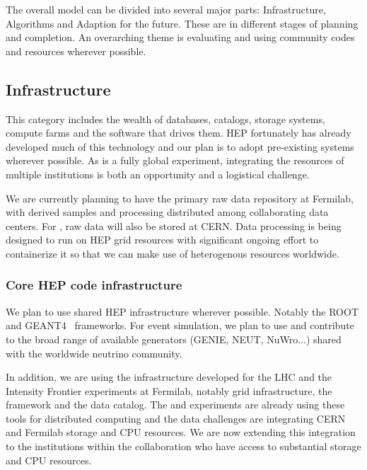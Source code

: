 The overall model can be divided into several major parts:  Infrastructure, Algorithms and Adaption for the future.  These are in different stages of planning and completion.  An overarching theme is evaluating and using community codes and resources wherever possible. 



\subsection{Infrastructure}
This category includes the wealth of databases, catalogs, storage systems, compute farms and the software that drives them.  HEP fortunately has already developed much of this technology and our plan is to adopt pre-existing systems wherever possible.  As   is a fully global experiment, integrating the resources of multiple institutions is both an opportunity and a logistical challenge.

We are currently planning to have the primary raw data repository at Fermilab, with derived samples and processing distributed among collaborating data centers.  For , raw data will also be stored at CERN.  Data processing is being designed to run on HEP grid resources with significant ongoing effort to containerize it so that we can make use of heterogenous resources worldwide. 


\subsubsection{Core HEP code infrastructure}
We plan to use shared HEP infrastructure wherever possible.  Notably the ROOT\cite{root} and GEANT4~\cite{geant4,Allison:2006ve} frameworks.   For event simulation, we plan to use and contribute to  the broad range of available generators (GENIE, NEUT, NuWro...) shared with the worldwide neutrino community.

In addition, we are using the infrastructure developed for the LHC and the Intensity Frontier experiments at Fermilab, notably grid infrastructure,  the  framework and the  data catalog.  The  and  experiments are already using these tools for distributed computing and the  data challenges are integrating CERN and Fermilab storage and CPU resources.  We are now extending this integration to the  institutions within the collaboration who have access to substantial storage and CPU resources. 



